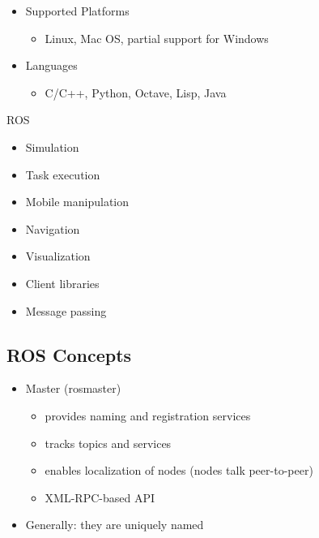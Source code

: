 \lyxframeend{}


\lyxframeend{}
\begin{itemize}
\item Supported Platforms

\begin{itemize}
\item Linux, Mac OS, partial support for Windows
\end{itemize}
\end{itemize}

\pause{}
\begin{itemize}
\item Languages

\begin{itemize}
\item C/C++, Python, Octave, Lisp, Java
\end{itemize}
\end{itemize}

\lyxframeend{}


\lyxframeend{}

ROS
\begin{itemize}
\item Simulation
\item Task execution
\item Mobile manipulation
\item Navigation
\item Visualization
\item Client libraries
\item Message passing
\end{itemize}

\lyxframeend{}


\lyxframeend{}\subsection{ROS Concepts}


\lyxframeend{}
\begin{itemize}
\item Master (rosmaster)

\begin{itemize}
\item provides naming and registration services
\item tracks topics and services
\item enables localization of nodes (nodes talk peer-to-peer)
\item XML-RPC-based API
\end{itemize}
\item Generally: they are uniquely named
\end{itemize}


